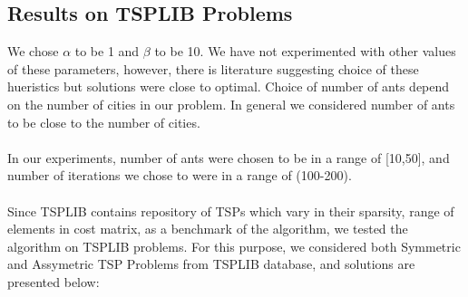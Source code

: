 \documentclass[14pt, english]{article}
\begin{document}
\subsection{Results on TSPLIB Problems}
We chose $\alpha$ to be 1 and $\beta$ to be 10. We have not experimented with other values of these parameters, however, there is literature suggesting choice of these hueristics but solutions were close to optimal. Choice of number of ants depend on the number of cities in our problem. In general we considered number of ants to be close to the number of cities. \\ 
\\
In our experiments, number of ants were chosen to be in a range of [10,50], and number of iterations we chose to were in a range of (100-200).\\
\\
Since TSPLIB contains repository of TSPs which vary in their sparsity, range of elements in cost matrix, as a benchmark of the algorithm, we tested the algorithm on TSPLIB problems. For this purpose, we considered both Symmetric and Assymetric TSP Problems from TSPLIB database, and solutions are presented below:
\end{document}
